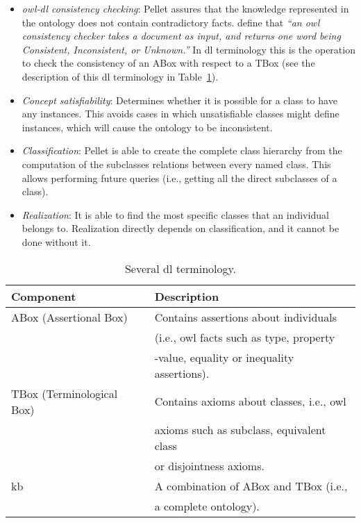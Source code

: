\begin{itemize}
  \item \textit{\ac{owl}-\ac{dl} consistency checking}: Pellet assures that the 
  knowledge represented in the ontology does not contain contradictory facts. 
  \citet{carroll_owl_2004} define that \textit{``an \ac{owl} consistency checker 
  takes a document as input, and returns one word being Consistent, Inconsistent, 
  or Unknown.''} In \ac{dl} terminology  this is the operation to check the 
  consistency of an ABox with respect to a TBox (see the description of this 
  \ac{dl} terminology in Table~\ref{tbl:dl_terms}).
  
  \item \textit{Concept satisfiability}: Determines whether it is possible for 
  a class to have any instances. This avoids cases in which unsatisfiable classes 
  might define instances, which will cause the ontology to be inconsistent.
  
  \item \textit{Classification}: Pellet is able to create the complete class 
  hierarchy from the computation of the subclasses relations between every 
  named class. This allows performing future queries (i.e., getting all the 
  direct subclasses of a class).
  
  \item \textit{Realization}: It is able to find the most specific classes that 
  an individual belongs to. Realization directly depends on classification, and 
  it cannot be done without it.
\end{itemize}


\begin{table}[H]
  \caption{Several \ac{dl} terminology.}
 \label{tbl:dl_terms}
\footnotesize
\centering
 \begin{tabular}{l l}
  \hline 
  \textbf{Component} 		& \textbf{Description}				\\
  \hline
  ABox (Assertional Box)	& Contains assertions about individuals	\\
				& (i.e., \ac{owl} facts such  as type, property	\\
				& -value, equality or inequality assertions).	\\
  TBox (Terminological Box)	& Contains axioms about classes, i.e., \ac{owl}	\\
				& axioms such as subclass, equivalent class 	\\
				& or disjointness axioms.			\\
  \acl{kb}			& A combination of ABox and TBox (i.e.,		\\
				& a complete ontology).				\\
  \hline
  
\end{tabular}
\end{table}

